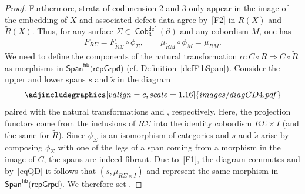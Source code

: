 \documentclass[10pt,a4paper]{amsart}
\DeclareMathOperator{\Cob}{\mathsf{Cob}}
\newcommand{\sslash}{\mathbin{/\mkern-6mu/}}
\numberwithin{equation}{section}
\theoremstyle{definition}
\begin{document}
\begin{proof}
 Furthermore, strata of codimension 2 and 3 only appear in the image of the embedding of $X$ and associated defect data agree by~\ref{F2} in $R(X)$ and $\widetilde{R}(X)$. Thus, for any surface $\Sigma \in \Cob_3^{\mathsf{def}}(\partial)$ and any cobordism $M$, one has
 \begin{align}
 \label{eqQD}
 F_{R\Sigma} = F_{\widetilde{R}\Sigma} \circ \phi_{\Sigma}, \qquad \mu_{\widetilde{R}M} \circ \phi_M = \mu_{RM}.
 \end{align}
 We need to define the components \smash{$\alpha_{\Sigma}\colon \mathcal{A}^{R(\Sigma)}\sslash \mathcal{G}^{R(\Sigma)} \rightarrow \mathcal{A}^{\widetilde{R}(\Sigma)}\sslash \mathcal{G}^{\widetilde{R}(\Sigma)}$} of the natural transformation $\alpha\colon C \circ R \Rightarrow C \circ \widetilde{R}$ as morphisms in $\mathsf{Span}^{\mathsf{fib}}(\mathsf{repGrpd)}$ (cf. Definition~\ref{defFibSpan}). Consider the upper and lower spans $s$ and $\widetilde{s}$ in the diagram
 \[
 \centering
 \adjincludegraphics[valign=c, scale = 1.16]{images/diagCD4.pdf}
 \]
 paired with the natural transformations  and , respectively. Here, the projection functors  come from the inclusions of $R\Sigma$ into the identity cobordism $R\Sigma \times I$ (and the same for $\widetilde{R}$). Since $\phi_{\Sigma}$ is an isomorphism of categories and $s$ and $\widetilde{s}$ arise by composing $\phi_{\Sigma}$ with one of the legs of a span coming from a morphism in the image of $C$, the spans are indeed fibrant. Due to~\ref{F1}, the diagram commutes and by~\eqref{eqQD} it follows that $(s, \mu_{R\Sigma \times I})$ and  represent the same morphism in $\mathsf{Span}^{\mathsf{fib}}(\mathsf{repGrpd)}$. We therefore set .


\end{proof}
\end{document}

